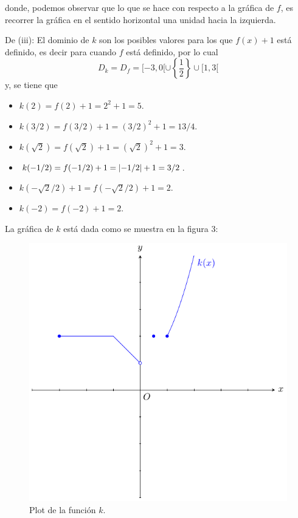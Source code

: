 \documentclass[12pt]{article}
\begin{document}
\begin{enumerate}
\begin{sol}
        donde, podemos observar que lo que se hace con respecto a la gráfica de $f$, es recorrer la gráfica en el sentido horizontal una unidad hacia la izquierda.

        De (iii): El dominio de $k$ son los posibles valores para los que $f(x)+1$ está definido, es decir para cuando $f$ está definido, por lo cual
        \begin{equation*}
            D_k=D_f=[-3,0[\cup\left\{\frac{1}{2}\right\}\cup[1,3[
        \end{equation*}
        y, se tiene que
        \begin{itemize}
            \item $k(2)=f(2)+1=2^2+1=5$.
            \item $k(3/2)=f(3/2)+1=\left(3/2\right)^2+1=13/4$.
            \item $k(\sqrt{2})=f(\sqrt{2})+1=\left(\sqrt{2} \right)^2+1=3$.
            \item $k(-1/2)=f(-1/2)+1=\left| -1/2 \right|+1=3/2$.
            \item $k(-\sqrt{2}/2)+1=f(-\sqrt{2}/2)+1=2$.
            \item $k(-2)=f(-2)+1=2$.
        \end{itemize}
        La gráfica de $k$ está dada como se muestra en la figura 3:
        \begin{figure}
            \begin{center}
                \includegraphics[scale=1]{images/3_1_3.pdf}
            \end{center}
            \caption{Plot de la función $k$.}
        \end{figure}


\end{sol}
\end{enumerate}
\end{document}

